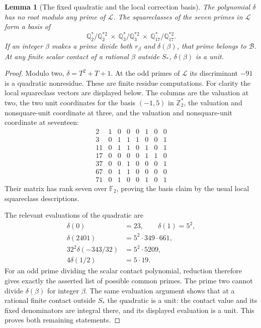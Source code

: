 \documentclass[11pt]{article}
\newtheorem{lemma}[theorem]{Lemma}
\theoremstyle{definition}
\begin{document}
\begin{lemma}[The fixed quadratic and the local correction basis]
\label{lem:scalar-fixed-quadratic}
The polynomial $\delta$ has no root modulo any prime of $\mathcal L$.
The squareclasses of the seven primes in $\mathcal L$ form a basis
of
\[
 \mathbb Q_2^*/\mathbb Q_2^{*2}\ \times\
 \mathbb Q_3^*/\mathbb Q_3^{*2}\ \times\
 \mathbb Q_{17}^*/\mathbb Q_{17}^{*2}.
\]
If an integer $\beta$ makes a prime divide both $r_\beta$ and
$\delta(\beta)$, that prime belongs to $\mathcal B$.  At any finite
scalar contact of a rational $\beta$ outside $S_*$, $\delta(\beta)$
is a unit.
\end{lemma}
\begin{proof}
Modulo two, $\delta=T^2+T+1$.  At the odd primes of $\mathcal L$
its discriminant $-91$ is a quadratic nonresidue.  These are finite
residue computations.  For clarity the local squareclass vectors
are displayed below.  The columns are the valuation at two, the
two unit coordinates for the basis $(-1,5)$ in $\mathbb Z_2^*$,
the valuation and nonsquare-unit coordinate at three, and the
valuation and nonsquare-unit coordinate at seventeen:
\[
\begin{array}{c|rrrrrrr}
2 &1&0&0&0&1&0&0\\
3 &0&1&1&1&0&0&1\\
11&0&1&1&0&1&0&1\\
17&0&0&0&0&1&1&0\\
37&0&0&1&0&0&0&1\\
67&0&1&1&0&0&0&0\\
71&0&1&0&0&1&0&1
\end{array}
\]
Their matrix has rank seven over $\mathbb F_2$, proving the basis
claim by the usual local squareclass descriptions.

The relevant evaluations of the quadratic are
\[
 \begin{split}
 \delta(0)&=23,\qquad \delta(1)=5^2,\\
 \delta(2401)&=5^2\cdot349\cdot661,\\
 32^2\delta(-343/32)&=5^2\cdot5209,\\
 4\delta(1/2)&=5\cdot19.
 \end{split}
\]
For an odd prime dividing the scalar contact polynomial, reduction
therefore gives exactly the asserted list of possible common primes.
The prime two cannot divide $\delta(\beta)$ for integer $\beta$.
The same evaluation argument shows that at a rational finite
contact outside $S_*$ the quadratic is a unit: the contact value
and its fixed denominators are integral there, and its displayed
evaluation is a unit.  This proves both remaining statements.
\end{proof}
\end{document}
